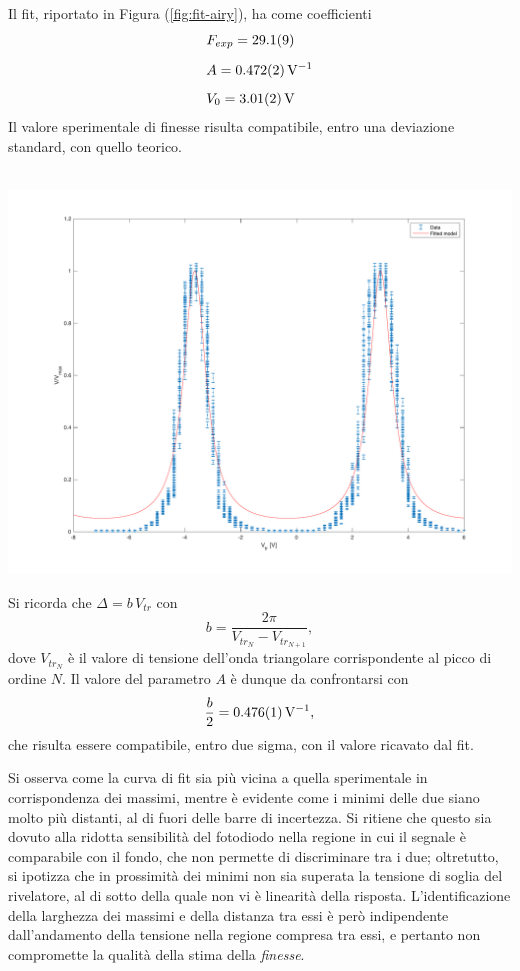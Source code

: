 \documentclass[10pt,oneside,a4paper]{article}
\newenvironment{Figure}
  {\par\medskip\noindent\minipage{\linewidth}}
  {\endminipage\par\medskip}
\begin{document}
\begin{multicols}{2}
Il fit, riportato in Figura (\ref{fig:fit-airy}), ha come coefficienti 
\begin{align*}
&F_{exp} = \SI{29.1\pm0.9}{}\\[0.2cm]
&A = \SI{0.472\pm0.002}{V^{-1}}\\[0.2cm]
&V_0 = \SI{3.01\pm0.02}{V}
\end{align*}
Il valore sperimentale di finesse risulta compatibile, entro una deviazione standard, con quello teorico. 

\begin{Figure}
	\begin{center}
	\hbox{\hspace{-0.8cm}
	\includegraphics[width=1.1\linewidth]{fit-airy}}
	\label{fig:fit-airy}
	\end{center}
\end{Figure}

Si ricorda che $\Delta = b\,V_{tr}$ con \[
b = \frac{2\pi}{V_{tr_N}-V_{tr_{N+1}}},
\]
dove $V_{tr_N}$ è il valore di tensione dell'onda triangolare corrispondente al picco di ordine $N$. Il valore del parametro $A$ è dunque da confrontarsi con \[
\frac{b}{2} = \SI{0.476\pm0.001}{V^{-1}},
\]
che risulta essere compatibile, entro due sigma, con il valore ricavato dal fit.

Si osserva come la curva di fit sia più vicina a quella sperimentale in corrispondenza dei massimi, mentre è evidente come i minimi delle due siano molto più distanti, al di fuori delle barre di incertezza. Si ritiene che questo sia dovuto alla ridotta sensibilità del fotodiodo nella regione in cui il segnale è comparabile con il fondo, che non permette di discriminare tra i due; oltretutto, si ipotizza che in prossimità dei minimi non sia superata la tensione di soglia del rivelatore, al di sotto della quale non vi è linearità della risposta. L'identificazione della larghezza dei massimi e della distanza tra essi è però indipendente dall'andamento della tensione nella regione compresa tra essi, e pertanto non compromette la qualità della stima della \emph{finesse}.  



\end{multicols}
\end{document}
